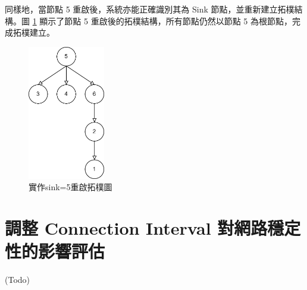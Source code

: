 \begin{ZhChapter}
同樣地，當節點 5 重啟後，系統亦能正確識別其為 Sink 節點，並重新建立拓樸結構。圖 \ref{fig: 實作sink=5重啟拓樸圖} 顯示了節點 5 重啟後的拓樸結構，所有節點仍然以節點 5 為根節點，完成拓樸建立。

\begin{figure}[H]
    \centering
    \includegraphics[width = 0.3\textwidth]{image/實作sink=5重啟拓樸圖.jpg}
    \caption{實作sink=5重啟拓樸圖}
    \label{fig: 實作sink=5重啟拓樸圖}
\end{figure}

\section{調整 Connection Interval 對網路穩定性的影響評估}
(Todo)

\end{ZhChapter}
